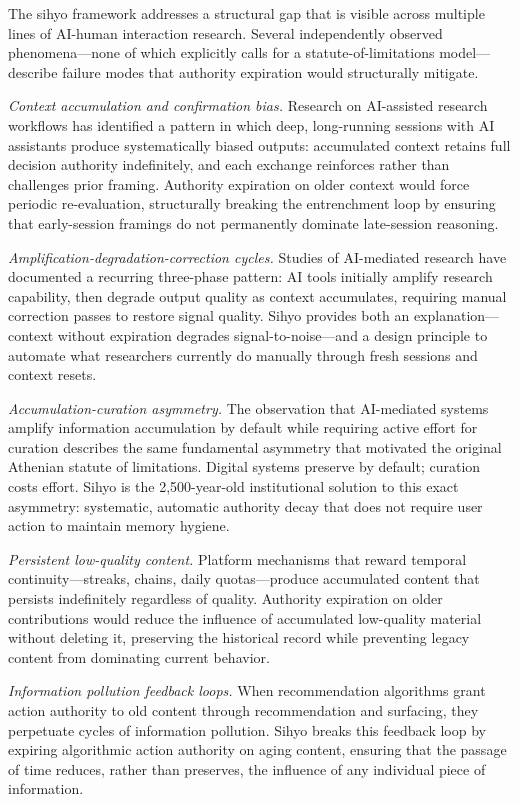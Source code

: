 \documentclass[12pt]{article}
\begin{document}
The sihyo framework addresses a structural gap that is visible across multiple lines of AI-human interaction research. Several independently observed phenomena---none of which explicitly calls for a statute-of-limitations model---describe failure modes that authority expiration would structurally mitigate.

\emph{Context accumulation and confirmation bias.} Research on AI-assisted research workflows has identified a pattern in which deep, long-running sessions with AI assistants produce systematically biased outputs: accumulated context retains full decision authority indefinitely, and each exchange reinforces rather than challenges prior framing. Authority expiration on older context would force periodic re-evaluation, structurally breaking the entrenchment loop by ensuring that early-session framings do not permanently dominate late-session reasoning.

\emph{Amplification-degradation-correction cycles.} Studies of AI-mediated research have documented a recurring three-phase pattern: AI tools initially amplify research capability, then degrade output quality as context accumulates, requiring manual correction passes to restore signal quality. Sihyo provides both an explanation---context without expiration degrades signal-to-noise---and a design principle to automate what researchers currently do manually through fresh sessions and context resets.

\emph{Accumulation-curation asymmetry.} The observation that AI-mediated systems amplify information accumulation by default while requiring active effort for curation describes the same fundamental asymmetry that motivated the original Athenian statute of limitations. Digital systems preserve by default; curation costs effort. Sihyo is the 2,500-year-old institutional solution to this exact asymmetry: systematic, automatic authority decay that does not require user action to maintain memory hygiene.

\emph{Persistent low-quality content.} Platform mechanisms that reward temporal continuity---streaks, chains, daily quotas---produce accumulated content that persists indefinitely regardless of quality. Authority expiration on older contributions would reduce the influence of accumulated low-quality material without deleting it, preserving the historical record while preventing legacy content from dominating current behavior.

\emph{Information pollution feedback loops.} When recommendation algorithms grant action authority to old content through recommendation and surfacing, they perpetuate cycles of information pollution. Sihyo breaks this feedback loop by expiring algorithmic action authority on aging content, ensuring that the passage of time reduces, rather than preserves, the influence of any individual piece of information.
\end{document}
